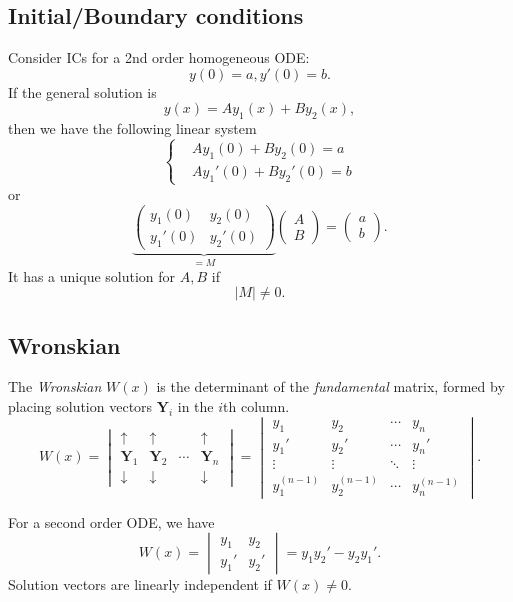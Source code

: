 \documentclass[10pt]{article}
\def\B{{\mathrm B}}
\begin{document}
    \subsection{Initial/Boundary conditions}
    Consider ICs for a 2nd order homogeneous ODE: 
    \[
        y(0)=a, y'(0)=b
    .\]
    If the general solution is 
    \[
        y(x)=Ay_1(x)+By_2(x)
    ,\]
    then we have the following linear system 
    \[
        \left\{ \begin{aligned}
            &Ay_1(0)+By_2(0)=a\\
            &Ay_1'(0)+By_2'(0)=b
        \end{aligned}\right.  
    \]
    or
    \[
        \underbrace{\begin{pmatrix}
            y_1(0)&y_2(0)\\
            y_1'(0)&y_2'(0)
        \end{pmatrix}}_{=M}
        \begin{pmatrix}
            A\\B
        \end{pmatrix}
        =
        \begin{pmatrix}
            a\\b
        \end{pmatrix}
    .\]
    It has a unique solution for $A,B$ if 
    \[
        |M|\neq 0
    .\] 
    \newpage
    \subsection{Wronskian}
    \begin{definition}
        The \textit{Wronskian} $ W(x) $ is the determinant of the \textit{fundamental} matrix, formed by placing solution vectors $ \mathbf{Y}_i $ in the $i$th column.
        \[
            W(x)=
            \begin{vmatrix}
                \uparrow &\uparrow &&\uparrow \\
                \mathbf{Y}_1&\mathbf{Y}_2&\cdots & \mathbf{Y}_n\\
                \downarrow & \downarrow & &  \downarrow
            \end{vmatrix}=
            \begin{vmatrix}y_{1}&y_{2}&\cdots &y_{n}\\y_{1}'&y_{2}'&\cdots &y_{n}'\\\vdots &\vdots &\ddots &\vdots \\y_{1}^{{(n-1)}}&y_{2}^{{(n-1)}}&\cdots &y_{n}^{{(n-1)}}\end{vmatrix}
        .\]
    \end{definition}
    For a second order ODE, we have 
    \begin{equation}\label{eq:12.4}
        W(x)=\begin{vmatrix}
            y_1&y_2\\
            y_1'&y_2'
        \end{vmatrix}=y_1y_2'-y_2y_1'.
    \end{equation}
    Solution vectors are linearly independent if $W(x)\neq 0$.
\end{document}
